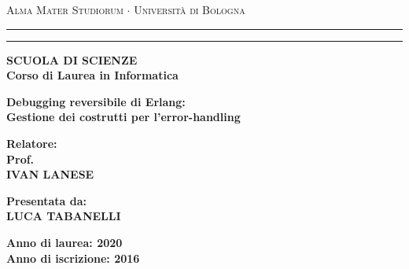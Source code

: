 \documentclass[a4paper,12pt]{article}
\begin{document}
\begin{titlepage}
\begin{center}
{{\Large{\textsc{Alma Mater Studiorum $\cdot$ Universit\`a di
Bologna}}}} \rule[0.1cm]{15.8cm}{0.1mm}
\rule[0.5cm]{15.8cm}{0.6mm}
{\small{\bf SCUOLA DI SCIENZE\\
Corso di Laurea in Informatica}}
\end{center}
\vspace{15mm}
\begin{center}
{\LARGE{\bf Debugging reversibile di Erlang:}}\\
\vspace{3mm}
{\LARGE{\bf Gestione dei costrutti per l'error-handling}}\\
\end{center}
\vspace{40mm}
\par
\noindent
\begin{minipage}[t]{0.47\textwidth}
{\large{\bf Relatore:\\
Prof.\\
IVAN LANESE}}
\end{minipage}
\hfill
\begin{minipage}[t]{0.47\textwidth}\raggedleft
{\large{\bf Presentata da:\\
LUCA TABANELLI}}
\end{minipage}
\vspace{20mm}
\begin{center}
{\large{\bf Anno di laurea: 2020\\%
Anno di iscrizione: 2016 }}%
\end{center}
\end{titlepage}
\tableofcontents
\clearpage




\clearpage
\printbibliography
\end{document}
